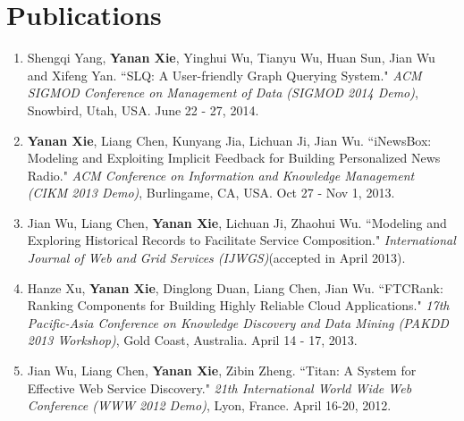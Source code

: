 \documentclass[letterpaper,9pt]{article}
\begin{document}
  
\section{Publications}
\begin{enumerate}
  \small
    \item Shengqi Yang, {\bf Yanan Xie}, Yinghui Wu, Tianyu Wu, Huan Sun, Jian Wu and Xifeng Yan.  ``SLQ: A User-friendly Graph Querying System." \emph{ACM SIGMOD Conference on Management of Data (SIGMOD 2014 Demo)}, Snowbird, Utah, USA. June 22 - 27, 2014.
    \vspace{-5pt} \item {\bf Yanan Xie}, Liang Chen, Kunyang Jia, Lichuan Ji, Jian Wu.  ``iNewsBox: Modeling and Exploiting Implicit Feedback for Building Personalized News Radio." \emph{ACM Conference on Information and Knowledge Management (CIKM 2013 Demo)}, Burlingame, CA, USA. Oct 27 - Nov 1, 2013.
    \vspace{-5pt} \item Jian Wu, Liang Chen, {\bf Yanan Xie}, Lichuan Ji, Zhaohui Wu.  ``Modeling and Exploring Historical Records to Facilitate Service Composition." \emph{International Journal of Web and Grid Services (IJWGS)}(accepted in April 2013).
    \vspace{-5pt} \item Hanze Xu, {\bf Yanan Xie}, Dinglong Duan, Liang Chen, Jian Wu.  ``FTCRank: Ranking Components for Building Highly Reliable Cloud Applications." \emph{17th Pacific-Asia Conference on Knowledge Discovery and Data Mining (PAKDD 2013 Workshop)}, Gold Coast, Australia. April 14 - 17, 2013.
    \vspace{-5pt} \item Jian Wu, Liang Chen, {\bf Yanan Xie}, Zibin Zheng. ``Titan: A System for Effective Web Service Discovery."  \emph{21th International World Wide Web Conference (WWW 2012 Demo)}, Lyon, France. April 16-20, 2012.
\end{enumerate}
\end{document}
